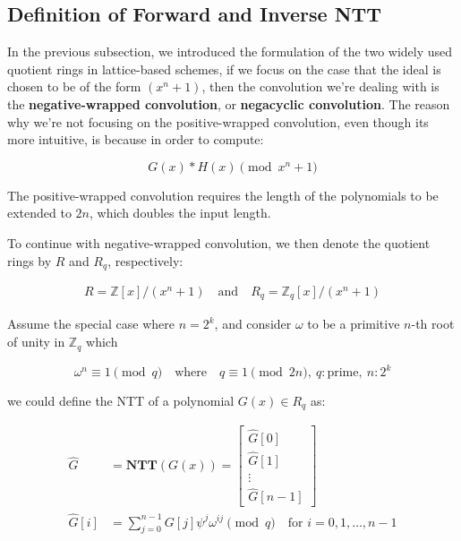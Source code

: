 \documentclass[12pt]{article}
\begin{document}
\subsection{Definition of Forward and Inverse NTT}

In the previous subsection, 
we introduced the formulation of the two widely used quotient rings in lattice-based schemes, 
if we focus on the case that the ideal is chosen to be of the form $(x^n + 1)$, 
then the convolution we're dealing with is the \textbf{negative-wrapped convolution}, or \textbf{negacyclic convolution}.
The reason why we're not focusing on the positive-wrapped convolution, even though its more intuitive, 
is because in order to compute:

\begin{equation*}
    G(x) * H(x) \pmod{x^n + 1}
\end{equation*}

The positive-wrapped convolution requires the length of the polynomials to be extended to $2n$, 
which doubles the input length.
\cite[p.~5]{fpga}

To continue with negative-wrapped convolution, we then denote the quotient rings by $R$ and $R_q$, respectively:

\begin{align*}
    R = \mathbb{Z}[x] / (x^n + 1) \quad \text{and} \quad R_q = \mathbb{Z}_q[x] / (x^n + 1)
\end{align*}

Assume the special case where $n = 2^k$, 
and consider $\omega$ to be a primitive $n$-th root of unity in $\mathbb{Z}_q$
which

\begin{equation*}
    \omega^n \equiv 1 \pmod{q} \quad \text{where} \quad q \equiv 1 \pmod{2n}, \ q: \text{prime}, \ n: 2^k 
\end{equation*}

we could define the NTT of a polynomial $G(x) \in R_q$ as:

\begin{align*}
    \hat{G} &= \mathbf{NTT}(G(x)) = 
    \begin{bmatrix}
        \hat{G}[0] \\
        \hat{G}[1] \\
        \vdots \\
        \hat{G}[n-1]
    \end{bmatrix} \\
    \hat{G}[i] &= \sum_{j = 0}^{n - 1} G[j] \psi^j \omega^{i j} \pmod{q} \quad \text{for } i = 0, 1, \ldots, n-1
\end{align*}
\cite[p.~8]{beginner_guide}
\end{document}
